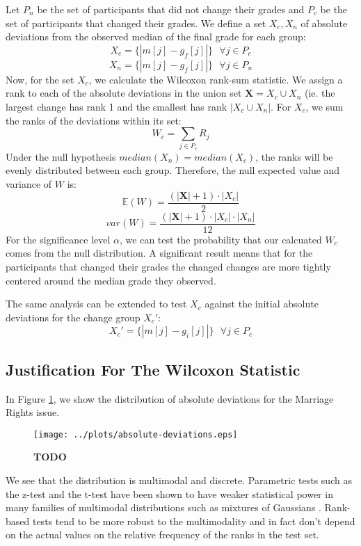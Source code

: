 Let $P_n$ be the set of participants that did not change their grades and $P_c$ be the set of participants that changed their grades.
We define a set $X_c,X_n$ of absolute deviations from the observed median of the final grade for each group:
\begin{equation}
X_c = \{|m[j] - g_f[j]|\}\text{ }\forall j \in P_c
\end{equation}
\begin{equation}
X_n = \{|m[j] - g_f[j]|\}\text{ }\forall j \in P_n
\end{equation}
Now, for the set $X_c$, we calculate the Wilcoxon rank-sum statistic.
We assign a rank to each of the absolute deviations in the union set $\textbf{X} = X_c \cup X_n$ (ie. the largest change has rank 1 and the smallest has rank $|X_c \cup X_n|$.
For $X_c$, we sum the ranks of the deviations within its set:
\begin{equation}
W_c = \sum_{j \in P_c} R_j
\end{equation}
Under the null hypothesis $median(X_n) = median(X_c)$, the ranks will be evenly distributed between each group. 
Therefore, the null expected value and variance of $W$ is:
\begin{equation}
\mathbb{E}(W) = \frac{(|\textbf{X}| + 1)\cdot |X_c|}{2}
\end{equation}
\begin{equation}
var(W) = \frac{(|\textbf{X}| + 1)\cdot |X_c| \cdot |X_n|}{12}
\end{equation}
For the significance level $\alpha$, we can test the probability that our calcuated $W_c$ comes from the null distribution.
A significant result means that for the participants that changed their grades the changed changes are more tightly centered around the median grade they observed.

The same analysis can be extended to test $X_c$ against the initial absolute deviations for the change group $X_c'$:
\begin{equation}
X_c' = \{|m[j] - g_i[j]|\}\text{ }\forall j \in P_c
\end{equation}

\subsection{Justification For The Wilcoxon Statistic}
In Figure \ref{dist-1}, we show the distribution of absolute deviations for the Marriage Rights issue. 
\begin{figure}[ht!]
  \centering
    \texttt{[image: ../plots/absolute-deviations.eps]}
      \caption{\textbf{TODO}}
      \label{dist-1}
\end{figure}
We see that the distribution is multimodal and discrete. 
Parametric tests such as the z-test and the t-test have been shown to have weaker statistical power in many families of multimodal distributions such as mixtures of Gaussians \cite{???}.
Rank-based tests tend to be more robust to the multimodality and in fact don't depend on the actual values on the relative frequency of the ranks in the test set.



